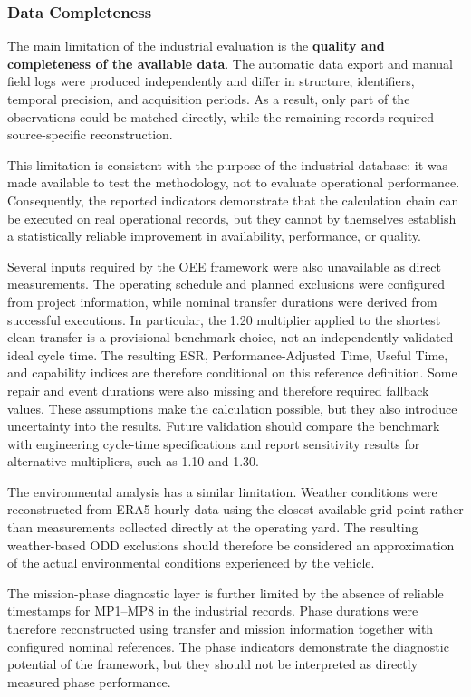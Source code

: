 \subsubsection{Data Completeness}
The main limitation of the industrial evaluation is the \textbf{quality and completeness of the available data}. The automatic data export and manual field logs were produced independently and differ in structure, identifiers, temporal precision, and acquisition periods. As a result, only part of the observations could be matched directly, while the remaining records required source-specific reconstruction.

This limitation is consistent with the purpose of the industrial database: it was made available to test the methodology, not to evaluate operational performance. Consequently, the reported indicators demonstrate that the calculation chain can be executed on real operational records, but they cannot by themselves establish a statistically reliable improvement in availability, performance, or quality.

Several inputs required by the OEE framework were also unavailable as direct measurements. The operating schedule and planned exclusions were configured from project information, while nominal transfer durations were derived from successful executions. In particular, the 1.20 multiplier applied to the shortest clean transfer is a provisional benchmark choice, not an independently validated ideal cycle time. The resulting ESR, Performance-Adjusted Time, Useful Time, and capability indices are therefore conditional on this reference definition. Some repair and event durations were also missing and therefore required fallback values. These assumptions make the calculation possible, but they also introduce uncertainty into the results. Future validation should compare the benchmark with engineering cycle-time specifications and report sensitivity results for alternative multipliers, such as 1.10 and 1.30.

The environmental analysis has a similar limitation. Weather conditions were reconstructed from ERA5 hourly data using the closest available grid point rather than measurements collected directly at the operating yard. The resulting weather-based ODD exclusions should therefore be considered an approximation of the actual environmental conditions experienced by the vehicle.

The mission-phase diagnostic layer is further limited by the absence of reliable timestamps for MP1--MP8 in the industrial records. Phase durations were therefore reconstructed using transfer and mission information together with configured nominal references. The phase indicators demonstrate the diagnostic potential of the framework, but they should not be interpreted as directly measured phase performance.


